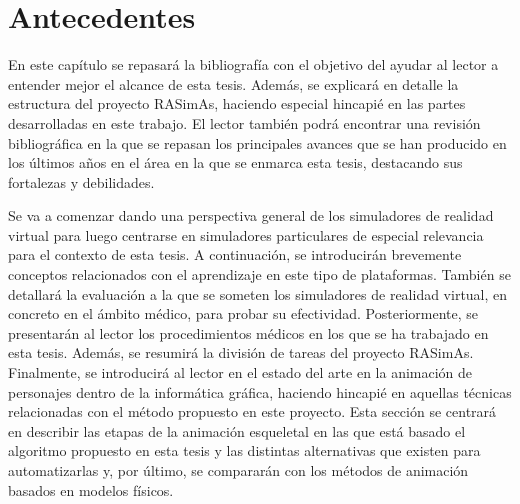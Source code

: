 \chapter{Antecedentes} 

\label{cap:related}



En este capítulo se repasará la bibliografía con el objetivo del ayudar al lector a entender mejor el alcance de esta tesis.
Además, se explicará en detalle la estructura del proyecto \ac{RASimAs}, haciendo especial hincapié en las partes desarrolladas en este trabajo. El lector también podrá encontrar una revisión bibliográfica en la que se repasan los principales avances que se han producido en los últimos años en el área en la que se enmarca esta tesis, destacando sus fortalezas y debilidades. 

Se va a comenzar dando una perspectiva general de los simuladores de realidad virtual para luego centrarse en simuladores particulares de especial relevancia para el contexto de esta tesis. A continuación, se introducirán brevemente conceptos relacionados con el aprendizaje en este tipo de plataformas. También se detallará la evaluación a la que se someten los simuladores de realidad virtual, en concreto en el ámbito médico, para probar su efectividad. Posteriormente, se presentarán al lector los procedimientos médicos en los que se ha trabajado en esta tesis. Además, se resumirá la división de tareas del proyecto \ac{RASimAs}. 
Finalmente, se introducirá al lector en el estado del arte en la animación de personajes dentro de la informática gráfica, haciendo hincapié en aquellas técnicas relacionadas con el método propuesto en este proyecto. Esta sección se centrará en describir las etapas de la animación esqueletal en las que está basado el algoritmo propuesto en esta tesis y las distintas alternativas que existen para automatizarlas y, por último, se compararán con los métodos de animación basados en modelos físicos.


